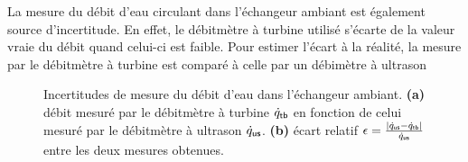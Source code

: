 La mesure du débit d'eau circulant dans l'échangeur ambiant est également source d'incertitude. En effet, le débitmètre à turbine utilisé  s'écarte de la valeur vraie du débit quand celui-ci est faible. Pour estimer l'écart à la réalité, la mesure par le débitmètre à turbine est comparé à celle par un débimètre à ultrason 

\begin{figure}[!ht]
    \centering
    
    \caption[Incertitudes de mesure du débit d'eau dans l'échangeur ambiant]{Incertitudes de mesure du débit d'eau dans l'échangeur ambiant. \textbf{(a)} débit mesuré par le débitmètre à turbine $\dot q_{\sf tb}$ en fonction de celui mesuré par le débitmètre à ultrason $\dot q_{\sf us}$. \textbf{(b)} écart relatif $\epsilon=\frac{|\dot q_{\sf us}-\dot q_{\sf tb}|}{\dot q_{\sf us}}$ entre les deux mesures obtenues.}
    \label{fig:IncertitudeDebitEau}
\end{figure}%

